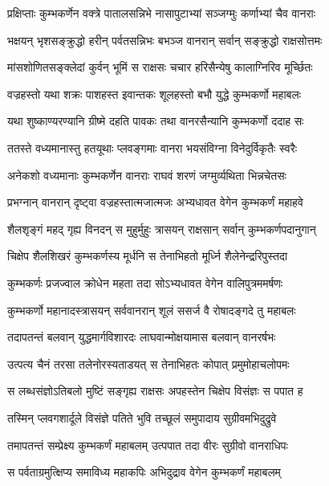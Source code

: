 \twolineshloka
{प्रक्षिप्ताः कुम्भकर्णेन वक्त्रे पातालसन्निभे}
{नासापुटाभ्यां सञ्जग्मुः कर्णाभ्यां चैव वानराः} %

\twolineshloka
{भक्षयन् भृशसङ्क्रुद्धो हरीन् पर्वतसन्निभः}
{बभञ्ज वानरान् सर्वान् सङ्क्रुद्धो राक्षसोत्तमः} %

\twolineshloka
{मांसशोणितसङ्क्लेदां कुर्वन् भूमिं स राक्षसः}
{चचार हरिसैन्येषु कालाग्निरिव मूर्च्छितः} %

\twolineshloka
{वज्रहस्तो यथा शक्रः पाशहस्त इवान्तकः}
{शूलहस्तो बभौ युद्धे कुम्भकर्णो महाबलः} %

\twolineshloka
{यथा शुष्काण्यरण्यानि ग्रीष्मे दहति पावकः}
{तथा वानरसैन्यानि कुम्भकर्णो ददाह सः} %

\twolineshloka
{ततस्ते वध्यमानास्तु हतयूथाः प्लवङ्गमाः}
{वानरा भयसंविग्ना विनेदुर्विकृतैः स्वरैः} %

\twolineshloka
{अनेकशो वध्यमानाः कुम्भकर्णेन वानराः}
{राघवं शरणं जग्मुर्व्यथिता भिन्नचेतसः} %

\twolineshloka
{प्रभग्नान् वानरान् दृष्ट्वा वज्रहस्तात्मजात्मजः}
{अभ्यधावत वेगेन कुम्भकर्णं महाहवे} %

\twolineshloka
{शैलशृङ्गं महद् गृह्य विनदन् स मुहुर्मुहुः}
{त्रासयन् राक्षसान् सर्वान् कुम्भकर्णपदानुगान्} %

\twolineshloka
{चिक्षेप शैलशिखरं कुम्भकर्णस्य मूर्धनि}
{स तेनाभिहतो मूर्ध्नि शैलेनेन्द्ररिपुस्तदा} %

\twolineshloka
{कुम्भकर्णः प्रजज्वाल क्रोधेन महता तदा}
{सोऽभ्यधावत वेगेन वालिपुत्रममर्षणः} %

\twolineshloka
{कुम्भकर्णो महानादस्त्रासयन् सर्ववानरान्}
{शूलं ससर्ज वै रोषादङ्गदे तु महाबलः} %

\twolineshloka
{तदापतन्तं बलवान् युद्धमार्गविशारदः}
{लाघवान्मोक्षयामास बलवान् वानरर्षभः} %

\twolineshloka
{उत्पत्य चैनं तरसा तलेनोरस्यताडयत्}
{स तेनाभिहतः कोपात् प्रमुमोहाचलोपमः} %

\twolineshloka
{स लब्धसंज्ञोऽतिबलो मुष्टिं सङ्गृह्य राक्षसः}
{अपहस्तेन चिक्षेप विसंज्ञः स पपात ह} %

\twolineshloka
{तस्मिन् प्लवगशार्दूले विसंज्ञे पतिते भुवि}
{तच्छूलं समुपादाय सुग्रीवमभिदुद्रुवे} %

\twolineshloka
{तमापतन्तं सम्प्रेक्ष्य कुम्भकर्णं महाबलम्}
{उत्पपात तदा वीरः सुग्रीवो वानराधिपः} %

\twolineshloka
{स पर्वताग्रमुत्क्षिप्य समाविध्य महाकपिः}
{अभिदुद्राव वेगेन कुम्भकर्णं महाबलम्} %


